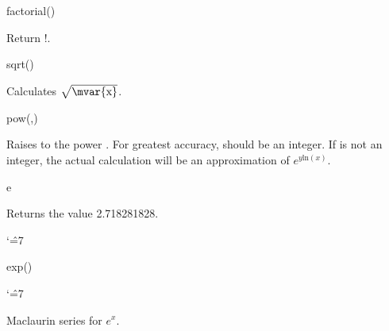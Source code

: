 \begin{math-function}{factorial()}
\mathcommand

  Return !.

\begin{codeexample}[]
 \pgfmathresult
\end{codeexample}

\end{math-function}

\begin{math-function}{sqrt()}
\mathcommand

 Calculates $\sqrt{\textrm{\mvar{x}}}$.

\begin{codeexample}[]
 \pgfmathresult
\end{codeexample}

\begin{codeexample}[]
  \pgfmathresult
\end{codeexample}

\end{math-function}

\begin{math-function}{pow(,)}
\mathcommand

 Raises  to the power . For greatest accuracy,
  should be an integer. If  is not an integer,
 the actual calculation will be an approximation of $e^{y\text{ln}(x)}$.

\begin{codeexample}[]
 \pgfmathresult
\end{codeexample}

\end{math-function}


\begin{math-function}{e}
\mathcommand

  Returns the value 2.718281828.
{
\catcode`\^=7

\begin{codeexample}[]
 \pgfmathresult
\end{codeexample}

}
\end{math-function}

\begin{math-function}{exp()}
\mathcommand

{
\catcode`\^=7

	Maclaurin series for $e^x$.
}	
\begin{codeexample}[]
 \pgfmathresult
\end{codeexample}

\begin{codeexample}[]
 \pgfmathresult
\end{codeexample}

\end{math-function}


